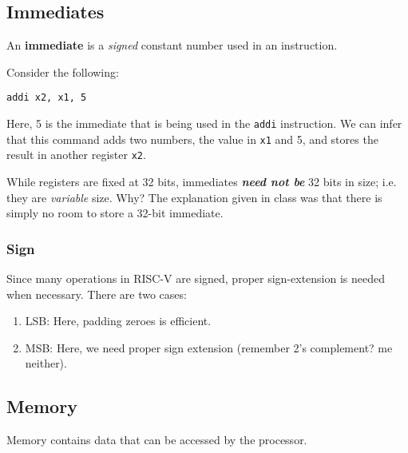 \documentclass{report}
\newcommand{\definition}[2]{\begin{tcolorbox}[title={Definition: #1}]{#2}\end{tcolorbox}}
\newcommand{\example}[2]{\begin{tcolorbox}[colback=blue!5!white,colframe=black!75!blue,title={Example:
      #1}]{#2}\end{tcolorbox}}
\newcommand{\corollary}[2]{\begin{tcolorbox}[colback=teal!5!white,colframe=black!75!teal,title={Corollary:
      #1}]{#2}\end{tcolorbox}}
\begin{document}
\subsection{Immediates}
\definition{Immediate}{
  An \textbf{immediate} is a \textit{signed} constant number used in an instruction.
}

\example{\texttt{addi}}{
  Consider the following:
  \begin{center}
    \texttt{addi x2, x1, 5}
  \end{center}
  Here, 5 is the immediate that is being used in the \texttt{addi} instruction. We can infer that
  this command adds two numbers, the value in \texttt{x1} and 5, and stores the result in another
  register \texttt{x2}.
}

\corollary{IMPORTANT: Immediate Sizes}{
  While registers are fixed at 32 bits, immediates \textbf{\textit{need not be}} 32 bits in
  size; i.e. they are \textit{variable} size. Why? The explanation given in class was that there is
  simply no room to store a 32-bit immediate.
}

\subsubsection{Sign}
Since many operations in RISC-V are signed, proper sign-extension is needed when necessary. There
are two cases:
\begin{enumerate}[label=\textit{Case (\roman*)}]
\item LSB: Here, padding zeroes is efficient.
\item MSB: Here, we need proper sign extension (remember 2's complement? me neither).
\end{enumerate}


\subsection{Memory}
Memory contains data that can be accessed by the processor.
\end{document}
